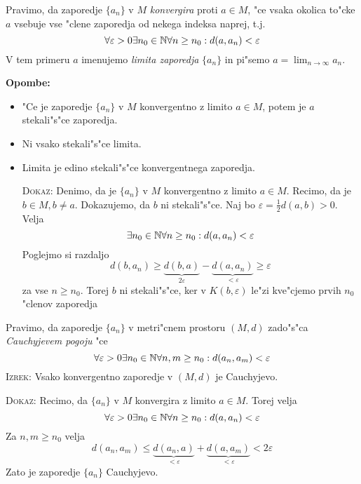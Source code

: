  Pravimo, da zaporedje $\{ a_n \}$ v $M$ \emph{konvergira} proti $a \in M$, "ce vsaka okolica to"cke $a$ vsebuje vse "clene zaporedja od nekega indeksa naprej, t.j.
\begin{equation*}
\forall \varepsilon > 0 \exists n_0 \in \mathbb{N} \forall n \geq n_0: d(a, a_n) < \varepsilon
\end{equation*}
V tem primeru $a$ imenujemo \emph{limita zaporedja} $\{ a_n \}$ in pi"semo $a = \lim_{n \to \infty} a_n$.

\textbf{Opombe:}
\begin{itemize}
    \item "Ce je zaporedje $\{ a_n \}$ v $M$ konvergentno z limito $a \in M$, potem je $a$ stekali"s"ce zaporedja. 
    \item Ni vsako stekali"s"ce limita. 
    \item Limita je edino stekali"s"ce konvergentnega zaporedja.
    
    \textsc{Dokaz:} Denimo, da je $\{ a_n \}$ v $M$ konvergentno z limito $a \in M$. Recimo, da je $b \in M, b \neq a$. Dokazujemo, da $b$ ni stekali"s"ce. Naj bo $\varepsilon = \frac{1}{2} d(a, b) > 0$. Velja
    \begin{equation*}
    \exists n_0 \in \mathbb{N} \forall n \geq n_0: d(a, a_n) < \varepsilon
    \end{equation*}
    Poglejmo si razdaljo
    \begin{equation*}
    d(b, a_n) \geq \underbrace{d(b,a)}_{2 \varepsilon} - \underbrace{d(a, a_n)}_{< \varepsilon} \geq \varepsilon
    \end{equation*}
    za vse $n \geq n_0$. Torej $b$ ni stekali"s"ce, ker v $K(b, \varepsilon)$ le"zi kve"cjemo prvih $n_0$ "clenov zaporedja
\end{itemize}

 Pravimo, da zaporedje $\{ a_n \}$ v metri"cnem prostoru $(M, d)$ zado"s"ca \emph{Cauchyjevem pogoju} "ce
\begin{equation*}
\forall \varepsilon > 0 \exists n_0 \in \mathbb{N} \forall n, m \geq n_0 : d(a_n, a_m) < \varepsilon
\end{equation*}
%
\textsc{Izrek:} Vsako konvergentno zaporedje v $(M, d)$ je Cauchyjevo.

\textsc{Dokaz:} Recimo, da $\{ a_n \}$ v $M$ konvergira z limito $a \in M$. Torej velja
\begin{equation*}
\forall \varepsilon > 0 \exists n_0 \in \mathbb{N} \forall n \geq n_0: d(a, a_n) < \varepsilon
\end{equation*}
Za $n, m \geq n_0$ velja
\begin{equation*}
d(a_n, a_m) \leq \underbrace{d(a_n, a)}_{< \varepsilon} + \underbrace{d(a, a_m)}_{< \varepsilon} < 2 \varepsilon
\end{equation*}
Zato je zaporedje $\{ a_n \}$ Cauchyjevo.

